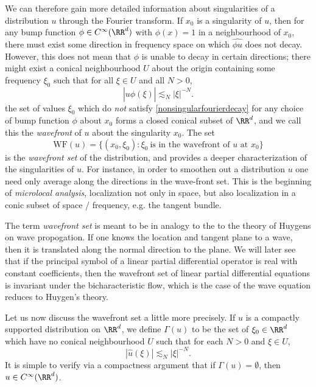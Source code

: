 We can therefore gain more detailed information about singularities of a distribution $u$ through the Fourier transform. If $x_0$ is a singularity of $u$, then for any bump function $\phi \in C^\infty(\RR^d)$ with $\phi(x) = 1$ in a neighbourhood of $x_0$, there must exist some direction in frequency space on which $\widehat{\phi u}$ does not decay. However, this does not mean that $\phi$ is unable to decay in certain directions; there might exist a conical neighbourhood $U$ about the origin containing some frequency $\xi_0$ such that for all $\xi \in U$ and all $N > 0$,
%
\begin{equation} \label{nonsingularfourierdecay}
  |\widehat{u \phi}(\xi)| \lesssim_N |\xi|^{-N}.
\end{equation}
%
the set of values $\xi_0$ which do \emph{not} satisfy \eqref{nonsingularfourierdecay} for any choice of bump function $\phi$ about $x_0$ forms a closed conical subset of $\RR^d$, and we call this the \emph{wavefront} of $u$ about the singularity $x_0$. The set
%
\[ \text{WF}(u) = \{ (x_0,\xi_0) : \xi_0\ \text{is in the wavefront of $u$ at $x_0$} \} \]
%
is the \emph{wavefront set} of the distribution, and provides a deeper characterization of the singularities of $u$. For instance, in order to smoothen out a distribution $u$ one need only average along the directions in the wave-front set. This is the beginning of \emph{microlocal analysis}, localization not only in space, but also localization in a conic subset of space / frequency, e.g. the tangent bundle.

\begin{remark}
    The term \emph{wavefront set} is meant to be in analogy to the to the theory of Huygens on wave propogation. If one knows the location and tangent plane to a wave, then it is translated along the normal direction to the plane. We will later see that if the principal symbol of a linear partial differential operator is real with constant coefficients, then the wavefront set of linear partial differential equations is invariant under the bicharacteristic flow, which is the case of the wave equation reduces to Huygen's theory.
\end{remark}

Let us now discuss the wavefront set a little more precisely. If $u$ is a compactly supported distribution on $\RR^d$, we define $\Gamma(u)$ to be the set of $\xi_0 \in \RR^d$ which have no conical neighbourhood $U$ such that for each $N > 0$ and $\xi \in U$,
%
\begin{equation} \label{fastDecayEquation}
    |\widehat{u}(\xi)| \lesssim_N |\xi|^{-N}.
\end{equation}
%
It is simple to verify via a compactness argument that if $\Gamma(u) = \emptyset$, then $u \in C^\infty(\RR^d)$.

